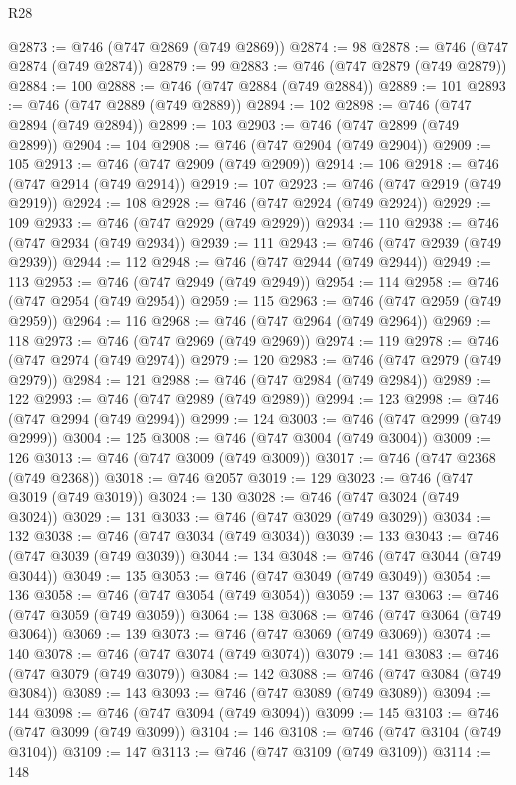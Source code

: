 \begin{lexlean}{R28}
\begin{coremodule}
@2873 := @746 (@747 @2869 (@749 @2869))
@2874 := 98
@2878 := @746 (@747 @2874 (@749 @2874))
@2879 := 99
@2883 := @746 (@747 @2879 (@749 @2879))
@2884 := 100
@2888 := @746 (@747 @2884 (@749 @2884))
@2889 := 101
@2893 := @746 (@747 @2889 (@749 @2889))
@2894 := 102
@2898 := @746 (@747 @2894 (@749 @2894))
@2899 := 103
@2903 := @746 (@747 @2899 (@749 @2899))
@2904 := 104
@2908 := @746 (@747 @2904 (@749 @2904))
@2909 := 105
@2913 := @746 (@747 @2909 (@749 @2909))
@2914 := 106
@2918 := @746 (@747 @2914 (@749 @2914))
@2919 := 107
@2923 := @746 (@747 @2919 (@749 @2919))
@2924 := 108
@2928 := @746 (@747 @2924 (@749 @2924))
@2929 := 109
@2933 := @746 (@747 @2929 (@749 @2929))
@2934 := 110
@2938 := @746 (@747 @2934 (@749 @2934))
@2939 := 111
@2943 := @746 (@747 @2939 (@749 @2939))
@2944 := 112
@2948 := @746 (@747 @2944 (@749 @2944))
@2949 := 113
@2953 := @746 (@747 @2949 (@749 @2949))
@2954 := 114
@2958 := @746 (@747 @2954 (@749 @2954))
@2959 := 115
@2963 := @746 (@747 @2959 (@749 @2959))
@2964 := 116
@2968 := @746 (@747 @2964 (@749 @2964))
@2969 := 118
@2973 := @746 (@747 @2969 (@749 @2969))
@2974 := 119
@2978 := @746 (@747 @2974 (@749 @2974))
@2979 := 120
@2983 := @746 (@747 @2979 (@749 @2979))
@2984 := 121
@2988 := @746 (@747 @2984 (@749 @2984))
@2989 := 122
@2993 := @746 (@747 @2989 (@749 @2989))
@2994 := 123
@2998 := @746 (@747 @2994 (@749 @2994))
@2999 := 124
@3003 := @746 (@747 @2999 (@749 @2999))
@3004 := 125
@3008 := @746 (@747 @3004 (@749 @3004))
@3009 := 126
@3013 := @746 (@747 @3009 (@749 @3009))
@3017 := @746 (@747 @2368 (@749 @2368))
@3018 := @746 @2057
@3019 := 129
@3023 := @746 (@747 @3019 (@749 @3019))
@3024 := 130
@3028 := @746 (@747 @3024 (@749 @3024))
@3029 := 131
@3033 := @746 (@747 @3029 (@749 @3029))
@3034 := 132
@3038 := @746 (@747 @3034 (@749 @3034))
@3039 := 133
@3043 := @746 (@747 @3039 (@749 @3039))
@3044 := 134
@3048 := @746 (@747 @3044 (@749 @3044))
@3049 := 135
@3053 := @746 (@747 @3049 (@749 @3049))
@3054 := 136
@3058 := @746 (@747 @3054 (@749 @3054))
@3059 := 137
@3063 := @746 (@747 @3059 (@749 @3059))
@3064 := 138
@3068 := @746 (@747 @3064 (@749 @3064))
@3069 := 139
@3073 := @746 (@747 @3069 (@749 @3069))
@3074 := 140
@3078 := @746 (@747 @3074 (@749 @3074))
@3079 := 141
@3083 := @746 (@747 @3079 (@749 @3079))
@3084 := 142
@3088 := @746 (@747 @3084 (@749 @3084))
@3089 := 143
@3093 := @746 (@747 @3089 (@749 @3089))
@3094 := 144
@3098 := @746 (@747 @3094 (@749 @3094))
@3099 := 145
@3103 := @746 (@747 @3099 (@749 @3099))
@3104 := 146
@3108 := @746 (@747 @3104 (@749 @3104))
@3109 := 147
@3113 := @746 (@747 @3109 (@749 @3109))
@3114 := 148

\end{coremodule}
\end{lexlean}
